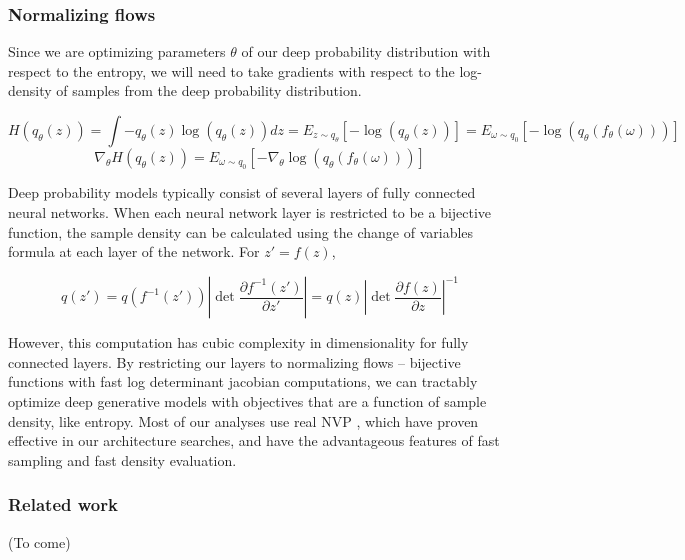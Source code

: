 \documentclass[11pt]{article}
\begin{document}
\subsubsection{Normalizing flows}\label{methods_NF}
Since we are optimizing parameters $\theta$ of our deep probability distribution with respect to the entropy, we will need to take gradients with respect to the log-density of samples from the deep probability distribution.

\begin{equation}
H(q_\theta(z)) = \int - q_\theta(z) \log(q_\theta(z)) dz = E_{z \sim q_\theta}\left[-\log(q_\theta(z)) \right] = E_{\omega \sim q_0}\left[-\log(q_\theta(f_\theta(\omega))) \right]
\end{equation}
\begin{equation}
\nabla_\theta H(q_\theta(z)) = E_{\omega \sim q_0}\left[- \nabla_\theta \log(q_\theta(f_\theta(\omega))) \right]
\end{equation}

Deep probability models typically consist of several layers of fully connected neural networks.  When each neural network layer is restricted to be a bijective function, the sample density can be calculated using the change of variables formula at each layer of the network.  For $z' = f(z)$,

\begin{equation}
q(z') = q(f^{-1}(z')) \left| \det \frac{\partial f^{-1}(z')}{\partial z'} \right| = q(z) \left| \det \frac{\partial f(z)}{\partial z} \right|^{-1}
\end{equation}

However, this computation has cubic complexity in dimensionality for fully connected layers.  By restricting our layers to normalizing flows \cite{rezende2015variational} -- bijective functions with fast log determinant jacobian computations, we can tractably optimize deep generative models with objectives that are a function of sample density, like entropy. Most of our analyses use real NVP \cite{dinh2017density}, which have proven effective in our architecture searches, and have the advantageous features of fast sampling and fast density evaluation.

\subsubsection{Related work}\label{methods_related_work}
(To come)\\
\end{document}
